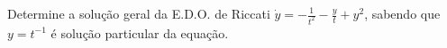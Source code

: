 \linespread{1.5}
Determine a solução geral da E.D.O. de Riccati $\dot{y} = -\frac{1}{t^2} -\frac{y}{t} + y^2$, sabendo que $y = t^{-1}$ é solução particular da equação.